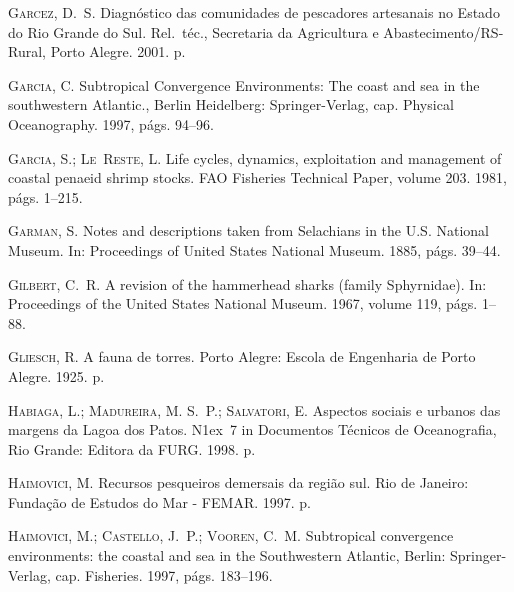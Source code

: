 \documentclass[a4paper,11pt,twoside,showtrims,onecolumn,openright,final]{memoir}
\begin{document}
\begin{thebibliography}{194}
\textsc{Garcez, D.~S.}
\newblock Diagn\'ostico das comunidades de pescadores artesanais no {E}stado do
  {R}io {G}rande do {S}ul.
\newblock Rel.\ t\'ec., Secretaria da Agricultura e Abastecimento/RS-Rural,
  Porto Alegre. 2001.
 p.

\textsc{Garcia, C.}
\newblock Subtropical {C}onvergence {E}nvironments: {T}he coast and sea in the
  southwestern {A}tlantic., Berlin Heidelberg: Springer-Verlag, cap. Physical
  Oceanography. 1997, p\'ags. 94--96.

\textsc{Garcia, S.; Le~Reste, L.}
\newblock Life cycles, dynamics, exploitation and management of coastal penaeid
  shrimp stocks.
\newblock FAO Fisheries Technical Paper, volume 203. 1981, p\'ags. 1--215.

\textsc{Garman, S.}
\newblock Notes and descriptions taken from {S}elachians in the {U}.{S}.
  {N}ational {M}useum.
\newblock In: Proceedings of {U}nited {S}tates {N}ational {M}useum. 1885,
  p\'ags. 39--44.

\textsc{Gilbert, C.~R.}
\newblock A revision of the hammerhead sharks (family {S}phyrnidae).
\newblock In: Proceedings of the {U}nited {S}tates {N}ational {M}useum. 1967,
  volume 119, p\'ags. 1--88.

\textsc{Gliesch, R.}
\newblock A fauna de torres.
\newblock Porto Alegre: Escola de Engenharia de Porto Alegre. 1925.
 p.

\textsc{Habiaga, L.; Madureira, M. S.~P.; Salvatori, E.}
\newblock Aspectos sociais e urbanos das margens da {L}agoa dos {P}atos.
\newblock N\raise1ex\hbox{}~7 in Documentos T\'ecnicos
  de Oceanografia, Rio Grande: Editora da FURG. 1998.
 p.

\textsc{Haimovici, M.}
\newblock Recursos pesqueiros demersais da regi\~ao sul.
\newblock Rio de Janeiro: Funda\c{c}\~ao de Estudos do Mar - FEMAR. 1997.
 p.

\textsc{Haimovici, M.; Castello, J.~P.; Vooren, C.~M.}
\newblock Subtropical convergence environments: the coastal and sea in the
  {S}outhwestern {A}tlantic, Berlin: Springer-Verlag, cap. Fisheries. 1997,
  p\'ags. 183--196.


\end{thebibliography}
\end{document}
